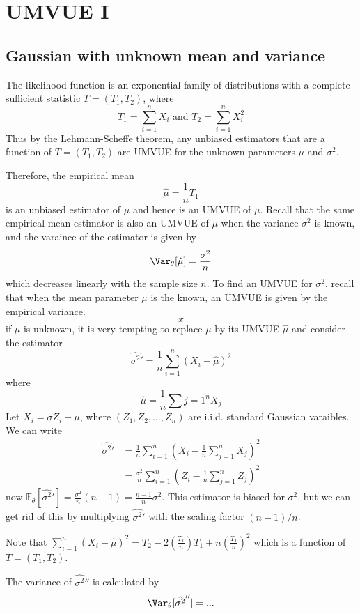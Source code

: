 \chapter{UMVUE I}

\section{Gaussian with unknown mean and variance}
The likelihood function is an exponential family of distributions with a complete sufficient statistic $T=(T_1,T_2)$, where
\[
    T_1 = \sum_{i=1}^n X_i \text{ and } T_2 = \sum_{i=1}^n X_i^2
\]
Thus by the Lehmann-Scheffe theorem, any unbiased estimators that are a function of $T=(T_1, T_2)$ are UMVUE for the unknown parameters $\mu$ and $\sigma^2$.

Therefore, the empirical mean
\[
    \hat{\mu} = \frac{1}{n} T_1
\]
is an unbiased estimator of $\mu$ and hence is an UMVUE of $\mu$. Recall that the same empirical-mean estimator is also an UMVUE of $\mu$ when the
variance $\sigma^2$ is known, and the varaince of the estimator is given by
\[
    \Var_\theta[\hat{\mu}] = \frac{\sigma^2}{n}
\]
which decreases linearly with the sample size $n$. To find an UMVUE for $\sigma^2$, recall that when the mean parameter $\mu$ is the known, an UMVUE is given by the
empirical variance.
\[
    x
\]
if $\mu$ is unknown, it is very tempting to replace $\mu$ by its UMVUE $\hat{\mu}$ and consider the estimator
\[
    \hat{\sigma^2}' = \frac{1}{n} \sum_{i=1}^n (X_i - \hat{\mu})^2
\]
where
\[
    \hat{\mu} = \frac{1}{n} \sum{j=1}^n X_j
\]
Let $X_i = \sigma Z_i + \mu$, where $(Z_1, Z_2, \dots, Z_n)$ are i.i.d. standard Gaussian varaibles. We can write
\begin{align*}
    \hat{\sigma^2}' & = \frac{1}{n} \sum_{i=1}^n \left( X_i - \frac{1}{n}\sum_{j=1}^n X_j \right)^2         \\
                    & = \frac{\sigma^2}{n} \sum_{i=1}^n \left( Z_i - \frac{1}{n} \sum_{j=1}^n Z_j \right)^2
\end{align*}
now $\mathbb{E}_\theta[\hat{\sigma^2}'] = \frac{\sigma^2}{n}(n-1)=\frac{n-1}{n}\sigma^2$. This estimator is biased for $\sigma^2$, but we can get
rid of this by multiplying $\hat{\sigma^2}'$ with the scaling factor $(n-1)/n$.

Note that $\sum_{i=1}^n (X_i - \hat{\mu})^2 = T_2 - 2 (\frac{T_1}{n}) T_1 + n (\frac{T_1}{n})^2$
which is a function of $T=(T_1, T_2)$.

The variance of $\hat{\sigma^2}''$ is calculated by
\begin{align*}
    \Var_\theta[\hat{\sigma^2}''] = ...
\end{align*}

